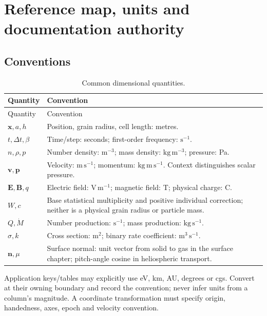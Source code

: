 \chapter{Reference map, units and documentation authority}\label{ch:reference}
\section{Conventions}
\begin{longtable}{L{0.20\textwidth}L{0.70\textwidth}}
\caption{Common dimensional quantities.}\\
\toprule Quantity & Convention\\\midrule\endfirsthead
\toprule Quantity & Convention\\\midrule\endhead
$\boldsymbol x,a,h$ & Position, grain radius, cell length: metres.\\
$t,\Delta t,\beta$ & Time/step: seconds; first-order frequency:
$\mathrm{s^{-1}}$.\\
$n,\rho,p$ & Number density: $\mathrm{m^{-3}}$; mass density:
$\mathrm{kg\,m^{-3}}$; pressure: Pa.\\
$\boldsymbol v,\boldsymbol p$ & Velocity: $\mathrm{m\,s^{-1}}$;
momentum: $\mathrm{kg\,m\,s^{-1}}$. Context distinguishes scalar pressure.\\
$\boldsymbol E,\boldsymbol B,q$ & Electric field: $\mathrm{V\,m^{-1}}$;
magnetic field: T; physical charge: C.\\
$W,c$ & Base statistical multiplicity and positive individual correction;
neither is a physical grain radius or particle mass.\\
$Q,\dot M$ & Number production: $\mathrm{s^{-1}}$; mass production:
$\mathrm{kg\,s^{-1}}$.\\
$\sigma,k$ & Cross section: $\mathrm{m^2}$; binary rate coefficient:
$\mathrm{m^3\,s^{-1}}$.\\
$\boldsymbol n,\mu$ & Surface normal: unit vector from solid to gas in the
surface chapter; pitch-angle cosine in heliospheric transport.\\
\bottomrule
\end{longtable}
Application keys/tables may explicitly use eV, km, AU, degrees or cgs.
Convert at their owning boundary and record the convention; never infer
units from a column's magnitude. A coordinate transformation must specify
origin, handedness, axes, epoch and velocity convention.


